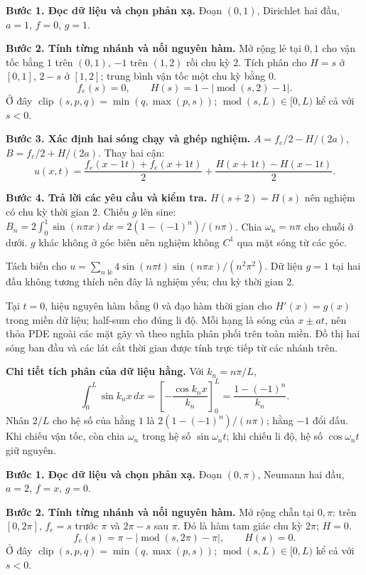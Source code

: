 \textbf{Bước 1. Đọc dữ liệu và chọn phản xạ.} Đoạn $(0,1)$, Dirichlet hai đầu, $a=1$, $f=0$, $g=1$.

\textbf{Bước 2. Tính từng nhánh và nối nguyên hàm.} Mở rộng lẻ tại $0,1$ cho vận tốc bằng $1$ trên $(0,1)$, $-1$ trên $(1,2)$ rồi chu kỳ $2$. Tích phân cho $H=s$ ở $[0,1]$, $2-s$ ở $[1,2]$; trung bình vận tốc một chu kỳ bằng $0$.
\[f_e(s)=0,\qquad H(s)=1-|\operatorname{mod}(s,2)-1|.\]
Ở đây $\operatorname{clip}(s,p,q)=\min(q,\max(p,s))$; $\operatorname{mod}(s,L)\in[0,L)$ kể cả với $s<0$.

\textbf{Bước 3. Xác định hai sóng chạy và ghép nghiệm.} $A=f_e/2-H/(2a)$, $B=f_e/2+H/(2a)$. Thay hai cận:
\[u(x,t)=\frac{f_e(x-1t)+f_e(x+1t)}2+\frac{H(x+1t)-H(x-1t)}{2}.\]

\textbf{Bước 4. Trả lời các yêu cầu và kiểm tra.} $H(s+2)=H(s)$ nên nghiệm có chu kỳ thời gian $2$. Chiếu $g$ lên sine: $B_n=2\int_0^1\sin(n\pi x)dx=2(1-(-1)^n)/(n\pi)$. Chia $\omega_n=n\pi$ cho chuỗi ở dưới. $g$ khác không ở góc biên nên nghiệm không $C^1$ qua mặt sóng từ các góc.

Tách biến cho $u=\sum_{n\text{ lẻ}}4\sin(n\pi t)\sin(n\pi x)/(n^2\pi^2)$. Dữ liệu $g=1$ tại hai đầu không tương thích nên đây là nghiệm yếu; chu kỳ thời gian 2.

Tại $t=0$, hiệu nguyên hàm bằng $0$ và đạo hàm thời gian cho $H'(x)=g(x)$ trong miền dữ liệu; half-sum cho đúng li độ. Mỗi hạng là sóng của $x\pm at$, nên thỏa PDE ngoài các mặt gãy và theo nghĩa phân phối trên toàn miền. Đồ thị hai sóng ban đầu và các lát cắt thời gian được tính trực tiếp từ các nhánh trên.

\textbf{Chi tiết tích phân của dữ liệu hằng.} Với $k_n=n\pi/L$,
\[\int_0^L\sin k_nx\,dx=\left[-\frac{\cos k_nx}{k_n}\right]_0^L=\frac{1-(-1)^n}{k_n}.\]
Nhân $2/L$ cho hệ số của hằng $1$ là $2(1-(-1)^n)/(n\pi)$; hằng $-1$ đổi dấu. Khi chiếu vận tốc, còn chia $\omega_n$ trong hệ số $\sin\omega_nt$; khi chiếu li độ, hệ số $\cos\omega_nt$ giữ nguyên.

\textbf{Bước 1. Đọc dữ liệu và chọn phản xạ.} Đoạn $(0,\pi)$, Neumann hai đầu, $a=2$, $f=x$, $g=0$.

\textbf{Bước 2. Tính từng nhánh và nối nguyên hàm.} Mở rộng chẵn tại $0,\pi$: trên $[0,2\pi]$, $f_e=s$ trước $\pi$ và $2\pi-s$ sau $\pi$. Đó là hàm tam giác chu kỳ $2\pi$; $H=0$.
\[f_e(s)=\pi-|\operatorname{mod}(s,2\pi)-\pi|,\qquad H(s)=0.\]
Ở đây $\operatorname{clip}(s,p,q)=\min(q,\max(p,s))$; $\operatorname{mod}(s,L)\in[0,L)$ kể cả với $s<0$.


